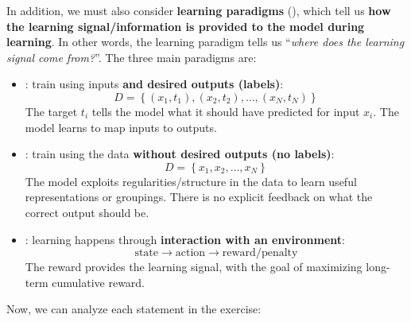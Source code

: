 \noindent
In addition, we must also consider \textbf{learning paradigms} (), which tell us \textbf{how the learning signal/information is provided to the model during learning}. In other words, the learning paradigm tells us ``\emph{where does the learning signal come from?}''. The three main paradigms are:
\begin{itemize}
    \item {}: train using inputs \textbf{and desired outputs (labels)}:
        \begin{equation*}
            D = \left\{(x_1, t_1), (x_2, t_2), \ldots, (x_N, t_N)\right\}
        \end{equation*}
        The target $t_i$ tells the model what it should have predicted for input $x_i$. The model learns to map inputs to outputs.

    \item {}: train using the data \textbf{without desired outputs (no labels)}:
        \begin{equation*}
            D = \left\{x_1, x_2, \ldots, x_N\right\}
        \end{equation*}
        The model exploits regularities/structure in the data to learn useful representations or groupings. There is no explicit feedback on what the correct output should be.

    \item {}: learning happens through \textbf{interaction with an environment}:
        \begin{equation*}
            \text{state} \to \text{action} \to \text{reward/penalty}
        \end{equation*}
        The reward provides the learning signal, with the goal of maximizing long-term cumulative reward.
\end{itemize}
Now, we can analyze each statement in the exercise:
